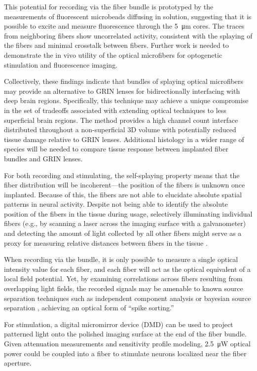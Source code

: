 This potential for recording via the fiber bundle is prototyped by 
the measurements of fluorescent microbeads diffusing in solution, 
suggesting that it is possible to excite and measure fluorescence 
through the 5~\si{\micro\meter} cores. The traces from 
neighboring fibers show uncorrelated activity, consistent with 
the splaying of the fibers and minimal crosstalk between fibers. 
Further work is needed to demonstrate the in vivo utility of the 
optical microfibers for optogenetic stimulation and fluorescence 
imaging.

Collectively, these findings indicate that bundles of splaying 
optical microfibers may provide an alternative to GRIN lenses for 
bidirectionally interfacing with deep brain regions. Specifically, 
this technique may achieve a unique compromise in the set of 
tradeoffs associated with extending optical techniques to less 
superficial brain regions. The method provides a high channel count 
interface distributed throughout a non-superficial 3D volume with 
potentially reduced tissue damage relative to GRIN lenses. Additional 
histology in a wider range of species will be needed to compare 
tissue response between implanted fiber bundles and GRIN lenses.

For both recording and stimulating, the self-splaying property means 
that the fiber distribution will be incoherent---the position of the 
fibers is unknown once implanted. Because of this, the fibers are not 
able to elucidate absolute spatial patterns in neural activity. 
Despite not being able to identify the absolute position of the fibers 
in the tissue during usage, selectively illuminating individual fibers 
(e.g., by scanning a laser across the imaging surface with a 
galvanometer) and detecting the amount of light collected by all other 
fibers might serve as a proxy for measuring relative distances between 
fibers in the tissue \cite{Heshmat:2016iq}.

When recording via the bundle, it is only possible to measure a single 
optical intensity value for each fiber, and each fiber will act as the 
optical equivalent of a local field potential. Yet, by examining 
correlations across fibers resulting from overlapping light fields, the 
recorded signals may be amenable to known source separation techniques 
such as independent component analysis \cite{Hyvarinen:2000vk} or 
bayesian source separation \cite{Knuth:2002vo}, achieving an optical 
form of ``spike sorting.''

For stimulation, a digital micromirror device (DMD) can be 
used to project patterned light onto the polished imaging 
surface at the end of the fiber bundle. Given attenuation 
measurements and sensitivity profile modeling, 
2.5~\si{\micro\watt} optical power could be coupled into a 
fiber to stimulate neurons localized near the fiber aperture.

